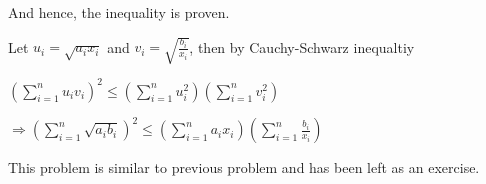  And hence, the inequality is proven.
\item Let $u_i = \sqrt{a_ix_i}$ and $v_i = \sqrt{\frac{b_i}{x_i}}$, then by Cauchy-Schwarz inequaltiy

  $\displaystyle\left( \sum_{i=1}^n u_i v_i \right)^2 \leq \left( \sum_{i=1}^n u_i^2 \right) \left( \sum_{i=1}^n
  v_i^2 \right)$

  $\Rightarrow\displaystyle \left( \sum_{i=1}^n \sqrt{a_i b_i} \right)^2 \leq \left( \sum_{i=1}^n a_i
  x_i \right) \left( \sum_{i=1}^n \frac{b_i}{x_i} \right)$
\item This problem is similar to previous problem and has been left as an exercise.
\stopitemize
